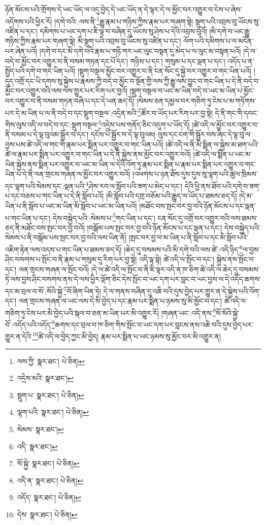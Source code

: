 ཉོན་མོངས་པའི་གྲོགས་དེ་ཡང་ཡོད་ལ་འདུ་བྱེད་དེ་ཡང་ཡོད་ན་དེ་ལྟར་དེ་ལ་མྱོང་བར་འགྱུར་བ་ངེས་པ་ཞེས་འདོགས་པའི་ཕྱིར་རོ། །དགེ་བའི་:ལས་ནི་\footnote{ལས་ཀྱི་  སྣར་ཐང་།  པེ་ཅིན། }རྒྱུ་རྣམ་པ་གཉིས་ཀྱིས་རྣམ་པར་གཞག་སྟེ། སྡུག་པའི་འབྲས་བུ་ཡོངས་སུ་འཛིན་པ་དང་། དམིགས་པ་ཡང་དག་པ་ཇི་ལྟ་བ་བཞིན་དུ་ཡོངས་སུ་ཤེས་པ་དེའི་འབྲས་བུའོ། །མི་དགེ་བ་ཡང་རྒྱུ་གཉིས་ཀྱིས་རྣམ་པར་གཞག་སྟེ། མི་སྡུག་པའི་འབྲས་བུ་ཡོངས་སུ་འཛིན་པ་དང་། ལོག་པའི་དམིགས་པ་ལ་མངོན་པར་ཞེན་པའོ། །དགེ་བ་དང་མི་དགེ་བའི་རྣམ་པ་གཉི་གར་ཡང་ལུང་བསྟན་དུ་མེད་པ་ལ་ལུང་མ་བསྟན་པའོ། །དེ་ལ་བདེ་བ་མྱོང་བར་འགྱུར་བ་ནི་བསམ་གཏན་དང་པོ་དང་། གཉིས་པ་དང་། གསུམ་པ་དང་ལྡན་པ་དང་། འདོད་པ་ན་སྤྱོད་པའི་དགེ་བ་གང་ཡིན་པའོ། །སྡུག་བསྔལ་མྱོང་བར་འགྱུར་བ་ནི་ངན་སོང་དུ་སྐྱེ་བར་འགྱུར་བ་གང་ཡིན་པའོ། །དུད་འགྲོ་དང་ཡི་དགས་སུ་སྐྱེས་པ་རྣམས་ཀྱི་བདེ་བ་མྱོང་བ་སྔོན་གྱི་ལས་ཀྱི་རྒྱུ་ལས་བྱུང་བ་གང་ཡིན་པ་དེ་ནི་བདེ་བ་མྱོང་བར་འགྱུར་བའི་ལས་ལས་གྱུར་པར་རིག་པར་བྱའོ། །སྡུག་བསྔལ་བ་ཡང་མ་ཡིན་བདེ་བ་ཡང་མ་ཡིན་པ་མྱོང་བར་འགྱུར་བ་ནི་བསམ་གཏན་བཞི་པ་དང་དེ་ཡན་ཆད་དོ། །སེམས་ཅན་དམྱལ་བར་གཅིག་ཏུ་ངེས་པ་མ་གཏོགས་པར་དེ་མ་ཡིན་པ་ལ་ནི་བདེ་བ་དང་སྡུག་བསྔལ་:འདྲེན་མའི་\footnote{འདྲེས་མའི་  སྣར་ཐང་། }ཚོར་བ་ཡོད་པར་རིག་པར་བྱ་སྟེ། དེ་ནི་གང་གི་དབང་གིས་ལུས་འདི་ལ་བདེ་བ་དང་:སྡུག་བསྔལ་\footnote{སྡུག་པ་  སྣར་ཐང་།  པེ་ཅིན། }འདྲེས་པས་གནོད་ཅིང་འདུག་པ་ཡོད་དོ། །ཚེ་འདི་ལ་མྱོང་བར་འགྱུར་བ་ནི་བསམ་པ་དེ་ལྟ་བུའམ་སྦྱོར་བ་དང་། དངོས་པོ་སྦྱོར་བ་དེ་ལྟ་བུའམ། ལུས་དང་ངག་གི་སྦྱོར་བས་ཞིང་དེ་ལྟ་བུ་ལ་བྱས་པས་ཚེ་འདི་ལ་གང་གི་རྣམ་པར་སྨིན་པར་འགྱུར་བ་གང་ཡིན་པའོ། །ཚེ་འདི་ལ་ནི་མི་སྨིན་ལ་སྐྱེས་མ་ཐག་པའི་ཚེ་ལ་རྣམ་པར་སྨིན་པར་འགྱུར་བ་གང་ཡིན་པ་དེ་ནི་སྐྱེས་ནས་མྱོང་བར་འགྱུར་བའོ། །ཚེ་འདི་ལ་སྨིན་པ་ཡང་མ་ཡིན་སྐྱེས་ནས་སྨིན་པར་འགྱུར་བ་ཡང་མ་ཡིན་ལ་དེའི་འོག་ཏུ་རྣམ་པར་སྨིན་པ་རྣམ་པར་སྨིན་པར་འགྱུར་བ་གང་ཡིན་པ་དེ་ནི་ལན་གྲངས་གཞན་ལ་མྱོང་བར་འགྱུར་བའོ། །འཕགས་པ་ཉན་ཐོས་དུས་དུས་སུ་ལྷག་པའི་ཚུལ་ཁྲིམས་དང་ལྷག་པའི་སེམས་དང་:ལྡན་པའི་\footnote{ལྷག་པའི་  སྣར་ཐང་།  པེ་ཅིན། }ཤེས་རབ་ལ་སློབ་པའི་ཟག་པ་མེད་པ་དང་། དེའི་ཕྱི་ནས་ཐོབ་པའི་དགེ་བ་ཟག་པ་དང་བཅས་པ་གང་ཡིན་པ་དེ་ནི་སློབ་པའོ། །མི་སློབ་པའི་དགྲ་བཅོམ་པའི་རྒྱུད་ལ་ཡོད་པ་ཐམས་ཅད་དོ། །དེ་མ་ཡིན་པ་ནི་སློབ་པ་ཡང་མ་ཡིན་མི་སློབ་པ་ཡང་མ་ཡིན་པའོ། །མཐོང་བས་སྤང་བར་བྱ་བའི་ཉོན་མོངས་པ་དང་ལྡན་པ་གང་ཡིན་པ་དང་། དེས་བསྐྱེད་པའི་:སེམས་པ་\footnote{སེམས་  སྣར་ཐང་། }གང་ཡིན་པ་དང་། ངན་སོང་དུ་འགྲོ་བར་འགྱུར་བའི་ལས་ཐམས་ཅད་ནི་མཐོང་བས་སྤང་བར་བྱ་བའོ། །བསྒོམ་པས་སྤང་བར་བྱ་བའི་ཉོན་མོངས་པ་དང་ལྡན་པ་དང་། དེས་བསྐྱེད་པའི་སེམས་པ་ནི་བསྒོམ་པས་སྤང་བར་བྱ་བའི་ལས་ཡིན་ནོ། །སྤང་བར་བྱ་བ་མ་ཡིན་པ་ནི་སློབ་པ་དང་མི་སློབ་པའི་འཇིག་རྟེན་ལས་འདས་པ་གང་ཡིན་པ་ཐམས་ཅད་དོ། །ཆེད་དུ་བསམས་པའི་མི་དགེ་བའི་ལས་ཚེ་:འདི་ཉིད་\footnote{འདི་  སྣར་ཐང་། }ལ་བྱས་ཤིང་བསགས་པ་སྤོང་བ་ནི་རྣམ་པ་གསུམ་དུ་རིག་པར་བྱ་སྟེ། འདི་ལྟ་སྟེ། ཚེ་འདི་ལ་སྤོང་བ་དང་། སྐྱེས་ནས་སྤོང་བ་དང་། ལན་གྲངས་གཞན་ལ་སྤོང་བའོ། །དེ་ལ་ཚེ་འདི་ལ་སྤོང་བ་ནི་ཇི་ལྟར་འདི་ན་ཁ་ཅིག་ཚེ་འདི་ལ་ཆེད་དུ་བསམས་ཏེ་ལས་བྱས་ཤིང་བསགས་ནས་དེ་ལས་ཕྱིར་ལྡོག་ཅིང་དེས་སྤོང་བ་ཡང་དག་པར་བླང་བ་ཡང་བྱས་ལ་དེ་འདོད་ཆགས་དང་མ་བྲལ་བ་སོ་:སོའི་སྐྱེ་\footnote{སོ་སྐྱེ་  སྣར་ཐང་།  པེ་ཅིན། }བོ་ཞིག་ཡིན་ཏེ། དེ་ལ་གནས་བཞིན་དུ་འཆི་བའི་དུས་བྱེད་པར་གྱུར་ན་དེ་སྐྱེས་པའི་འོག་དང་། ལན་གྲངས་གཞན་ལ་ཡང་ལས་དེ་མི་བྱེད་པ་དང་རྣམ་པར་སྨིན་པ་ཉམས་སུ་མི་མྱོང་བ་དང་། ཚེ་འདི་ལ་གཅིག་ཏུ་ངེས་པར་མི་བྱེད་པའི་སྐལ་བ་ཅན་མ་ཡིན་པར་མི་འགྱུར་རོ། །གཞན་ཡང་:འདི་ནས་\footnote{འདི་ན་  སྣར་ཐང་།  པེ་ཅིན། }སོ་སོའི་སྐྱེ་བོ་:འདོད་པའི་འདོད་\footnote{འདོད་  སྣར་ཐང་།  པེ་ཅིན། }ཆགས་དང་བྲལ་བ་ཁ་ཅིག་གིས་སྤོང་བ་ཡང་དག་པར་བླངས་ནས་འཆི་བའི་དུས་བྱེད་པར་གྱུར་ན་དེའི་\footnote{དེས་  སྣར་ཐང་།  པེ་ཅིན། }ཚེ་འདི་ལ་བྱེད་ཀྱང་མི་བྱེད། རྣམ་པར་སྨིན་པ་ཡང་ཉམས་སུ་མྱོང་བར་མི་འགྱུར་ན། 
